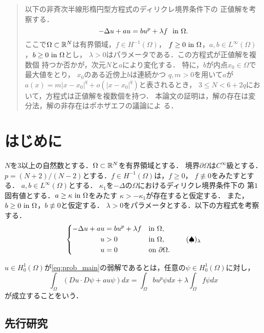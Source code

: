 \begin{abstract}
 以下の非斉次半線形楕円型方程式のディリクレ境界条件下の
 正値解を考察する．
 \[
  -\Delta u + a u = b u^p + \lambda f \ \ \text{in}~ \Omega.
 \]
 ここで$\Omega \subset \mathbb{R}^N$は有界領域，$f \in H^{-1}(\Omega)$，
 $f \geq 0 ~\text{in}~ \Omega$，$a, b \in L^\infty(\Omega)$，$b \geq 0 ~\text{in}~
 \Omega$とし，
 $\lambda > 0$はパラメータである．この方程式が正値解を複数個
 持つか否かが，次元$N$と$a$により変化する．
 特に，$b$が内点$x_0 \in \Omega$で最大値をとり，
 $x_0$のある近傍上$b$は連続かつ
 $q, m > 0$を用いて$a$が
 $a(x) = m \lvert x - x_0 \rvert^{q} + o( \lvert x - x_0
 \rvert^{q})$と表されるとき，
 $3 \leq N < 6 + 2q$において，方程式は正値解を複数個を持つ．
 本論文の証明は，解の存在は変分法，解の非存在はポホザエフの議論によ
 る．
\end{abstract}

\section{はじめに}

$N$を$3$以上の自然数とする．$\Omega \subset \mathbb{R}^N$を有界領域とする．
境界$\partial \Omega$は$C^\infty$級とする．
$p = (N+2)/(N-2)$とする．$f \in H^{-1}(\Omega)$は，$f \geq 0$，
$f \not \equiv 0$をみたすとする．
$a, b \in L^\infty(\Omega)$とする．
$\kappa_1$を$-\Delta$の$\Omega$におけるディリクレ境界条件下の
第$1$固有値とする．$a \geq \kappa ~\text{in}~ \Omega$をみたす
$\kappa > - \kappa_1$が存在すると仮定する．
また，$b \geq 0 ~\text{in}~ \Omega$，$b \not \equiv 0$と仮定する．
$\lambda > 0$をパラメータとする．以下の方程式を考察する．
\begin{align}
 \left\{
 \begin{aligned}
  -\Delta u + a u &= b u^p + \lambda f  & &\text{in}~ \Omega,  \\
  u &> 0 & &\text{in}~ \Omega, \\
  u &= 0 & &\text{on}~ \partial\Omega.
 \end{aligned}
 \right. \tag*{$(\spadesuit)_\lambda$} \label{eq:prob_main}
\end{align}

$u \in H_0^1(\Omega)$が\ref{eq:prob_main}の弱解であるとは，任意の$\psi
\in H_0^1(\Omega)$に対し，
\[
 \int_\Omega \left( Du \cdot D\psi + a u \psi \right) dx = \int_\Omega
 b u^p \psi dx + \lambda \int_\Omega f \psi dx
\]
が成立することをいう．

\subsection{先行研究}

